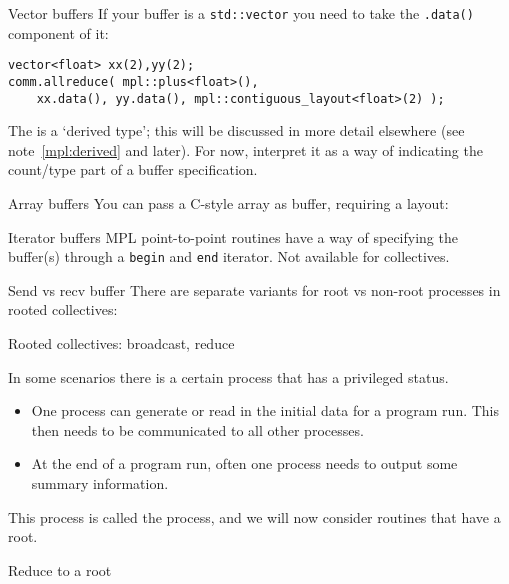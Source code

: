 \begin{mplnote}{Vector buffers}
  \label{mpl:vec-buf}
If your buffer is a \lstinline+std::vector+ you need
to take the \lstinline+.data()+ component of it:
\begin{lstlisting}
vector<float> xx(2),yy(2);
comm.allreduce( mpl::plus<float>(),
    xx.data(), yy.data(), mpl::contiguous_layout<float>(2) );
\end{lstlisting}
  The  is a `derived type';
this will be discussed in more detail elsewhere
(see note~\ref{mpl:derived} and later).
For now, interpret it as a way of indicating the count/type
part of a buffer specification.
\end{mplnote}

\begin{mplnote}{Array buffers}
  \label{mpl:vec-arr}
  You can pass a C-style array as buffer, requiring a layout:
\end{mplnote}

\begin{mplnote}{Iterator buffers}
  \label{mpl:buf-itr}
  MPL point-to-point routines have a way of specifying the buffer(s)
  through a \lstinline{begin} and \lstinline{end} iterator.
  Not available for collectives.
\end{mplnote}

\begin{mplnote}{Send vs recv buffer}
  There are separate variants for root vs non-root processes
  in rooted collectives:
\end{mplnote}

 {Rooted collectives: broadcast, reduce}
\label{sec:rooted}

In some scenarios there is a certain process that has a privileged status.
\begin{itemize}
\item
  One process can generate or read in the initial data for a program
  run. This then needs to be communicated to all other processes.
\item
  At the end of a program run, often
  one process needs to output some summary information.
\end{itemize}
This process is called the  process, and we will now
consider routines that have a root.

 {Reduce to a root}
\label{sec:reduce-root}

